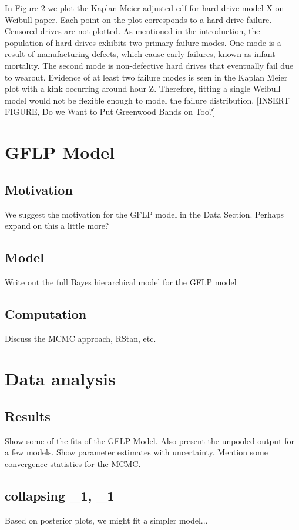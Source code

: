 \documentclass[12pt]{article}
\begin{document}
In Figure 2 we plot the Kaplan-Meier adjusted cdf for hard drive model X on Weibull paper.  Each point on the plot corresponds to a hard drive failure.  Censored drives are not plotted.  As mentioned in the introduction, the population of hard drives exhibits two primary failure modes.  One mode is a result of manufacturing defects, which cause early failures, known as infant mortality.  The second mode is non-defective hard drives that eventually fail due to wearout.   Evidence of at least two failure modes is seen in the Kaplan Meier plot with a kink occurring around hour Z.  Therefore, fitting a single Weibull model would not be flexible enough to model the failure distribution.     [INSERT FIGURE, Do we Want to Put Greenwood Bands on Too?]


\section{GFLP Model}
\subsection{Motivation}
We suggest the motivation for the GFLP model in the Data Section.  Perhaps expand on this a little more?

\subsection{Model}
Write out the full Bayes hierarchical model for the GFLP model

\subsection{Computation}
Discuss the MCMC approach, RStan, etc.

\section{Data analysis}
\subsection{Results}
Show some of the fits of the GFLP Model.  Also present the unpooled output for a few models.  Show parameter estimates with uncertainty. Mention some convergence statistics for the MCMC. 
\subsection{collapsing \mu_1, \sigma_1}
Based on posterior plots, we might fit a simpler model...
\end{document}
